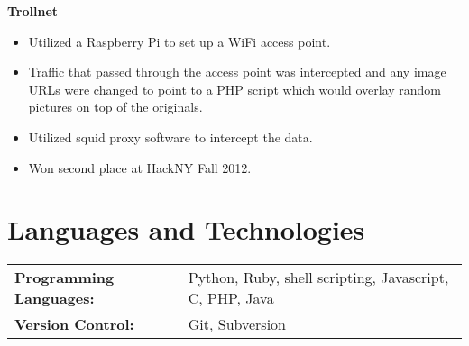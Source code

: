 \documentclass[centered,overlapped]{res}
\begin{document}
\begin{resume}
	{\bf Trollnet}
	\begin{itemize} \itemsep -2pt
		\item Utilized a Raspberry Pi to set up a WiFi access point.
		\item Traffic that passed through the access point was intercepted and
            any image URLs were changed to point to a PHP script which would
            overlay random pictures on top of the originals.
		\item Utilized squid proxy software to intercept the data.
		\item Won second place at HackNY Fall 2012.
	\end{itemize}


\section{Languages and Technologies}
\noindent
\begin{tabular}{@{} l l}
  \textbf{Programming Languages:} & Python, Ruby, shell scripting, Javascript,
    C, PHP, Java \\
  \textbf{Version Control:} & Git, Subversion \\
\end{tabular}

\end{resume}
\end{document}
